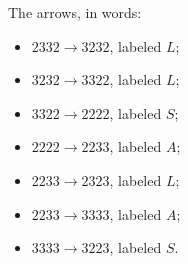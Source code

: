 The arrows, in words:
\begin{itemize}
\item $2332 \to 3232$, labeled $L$;
\item $3232 \to 3322$, labeled $L$;
\item $3322 \to 2222$, labeled $S$;
\item $2222 \to 2233$, labeled $A$;
\item $2233 \to 2323$, labeled $L$;
\item $2233 \to 3333$, labeled $A$;
\item $3333 \to 3223$, labeled $S$.
\end{itemize}


